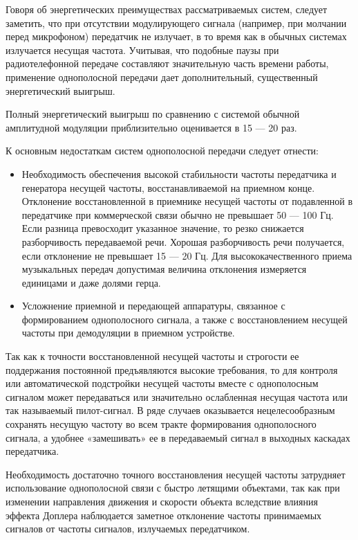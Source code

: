 Говоря об энергетических преимуществах рассматриваемых систем, следует заметить, что при отсутствии модулирующего сигнала (например, при молчании перед микрофоном) передатчик не излучает, в то время как в обычных системах излучается несущая частота. Учитывая, что подобные паузы при радиотелефонной передаче составляют значительную часть времени работы, применение однополосной передачи дает дополнительный, существенный энергетический выигрыш.

Полный энергетический выигрыш по сравнению с системой обычной амплитудной модуляции приблизительно оценивается в 15 — 20 раз. 

К основным недостаткам систем однополосной передачи следует отнести:
\begin{itemize}
	\item Необходимость обеспечения высокой стабильности частоты передатчика и генератора несущей частоты, восстанавливаемой на приемном конце. Отклонение восстановленной в приемнике несущей частоты от подавленной в передатчике при коммерческой связи обычно не превышает 50 — 100 Гц. Если разница превосходит указанное значение, то резко снижается
разборчивость передаваемой речи. Хорошая разборчивость речи получается, если отклонение не превышает 15 — 20 Гц. Для высококачественного приема музыкальных передач допустимая величина отклонения измеряется единицами и даже долями герца.
	\item Усложнение приемной и передающей аппаратуры, связанное с формированием однополосного сигнала, а также с восстановлением несущей частоты при демодуляции в приемном устройстве. 
\end{itemize}
Так как к точности восстановленной несущей частоты и строгости ее поддержания постоянной предъявляются высокие требования, то для контроля или автоматической подстройки несущей частоты вместе с однополосным сигналом может передаваться или значительно ослабленная несущая частота или так называемый пилот-сигнал. В ряде случаев оказывается нецелесообразным сохранять несущую частоту во всем тракте формирования однополосного сигнала, а удобнее «замешивать» ее в передаваемый сигнал в выходных каскадах передатчика.

Необходимость достаточно точного восстановления несущей частоты затрудняет использование однополосной связи с быстро летящими объектами, так как при изменении направления движения и скорости объекта вследствие влияния эффекта Доплера наблюдается заметное отклонение частоты принимаемых сигналов от частоты сигналов, излучаемых передатчиком.

